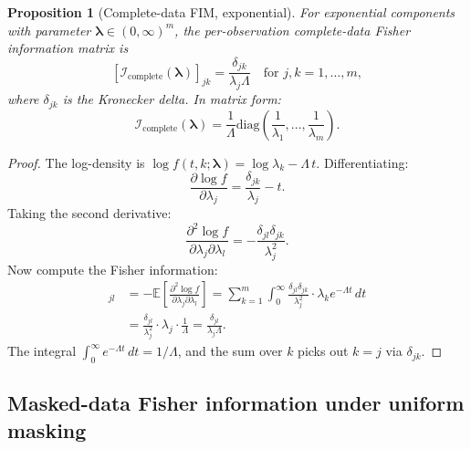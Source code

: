 \documentclass[11pt]{article}
\theoremstyle{definition}
\theoremstyle{plain}
\newtheorem{proposition}{Proposition}
\renewcommand{\v}[1]{\boldsymbol{#1}}
\newcommand{\E}{\mathbb{E}}
\newcommand{\diag}{\mathrm{diag}}
\newcommand{\FI}{\mathcal{I}}       %
\begin{document}
\begin{proposition}[Complete-data FIM, exponential]
\label{prop:complete-fim}
For exponential components with parameter $\v{\lambda} \in (0,\infty)^m$,
the per-observation complete-data Fisher information matrix is
\begin{equation}
\label{eq:complete-fim}
    [\FI_{\mathrm{complete}}(\v{\lambda})]_{jk}
    = \frac{\delta_{jk}}{\lambda_j \Lambda}
    \quad \text{for } j, k = 1, \ldots, m,
\end{equation}
where $\delta_{jk}$ is the Kronecker delta.
In matrix form:
\begin{equation}
    \FI_{\mathrm{complete}}(\v{\lambda})
    = \frac{1}{\Lambda} \diag\!\left(
        \frac{1}{\lambda_1}, \ldots, \frac{1}{\lambda_m}
    \right).
\end{equation}
\end{proposition}

\begin{proof}
The log-density is
$\log f(t, k; \v{\lambda}) = \log \lambda_k - \Lambda \, t$.
Differentiating:
\begin{equation}
    \frac{\partial \log f}{\partial \lambda_j}
    = \frac{\delta_{jk}}{\lambda_j} - t.
\end{equation}
Taking the second derivative:
\begin{equation}
    \frac{\partial^2 \log f}{\partial \lambda_j \partial \lambda_l}
    = -\frac{\delta_{jl} \delta_{jk}}{\lambda_j^2}.
\end{equation}
Now compute the Fisher information:
\begin{align}
    [\FI_{\mathrm{complete}}]_{jl}
    &= -\E\!\left[\frac{\partial^2 \log f}{\partial \lambda_j
        \partial \lambda_l}\right]
    = \sum_{k=1}^m \int_0^\infty \frac{\delta_{jl} \delta_{jk}}{\lambda_j^2}
        \cdot \lambda_k e^{-\Lambda t}\, dt \\
    &= \frac{\delta_{jl}}{\lambda_j^2} \cdot \lambda_j
        \cdot \frac{1}{\Lambda}
    = \frac{\delta_{jl}}{\lambda_j \Lambda}.
\end{align}
The integral $\int_0^\infty e^{-\Lambda t}\, dt = 1/\Lambda$, and
the sum over $k$ picks out $k = j$ via $\delta_{jk}$.
\end{proof}

\subsection{Masked-data Fisher information under uniform masking}
\end{document}
